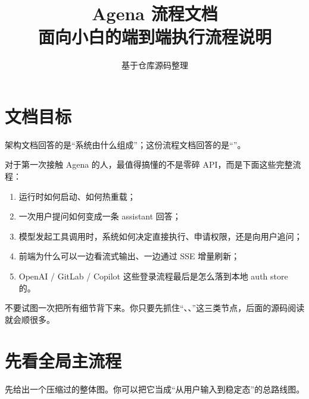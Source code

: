 \documentclass[11pt,a4paper]{ctexart}
\title{\textbf{Agena 流程文档}\\\large 面向小白的端到端执行流程说明}
\author{基于仓库源码整理}
\date{\docversion}
\begin{document}
\maketitle
\tableofcontents
\clearpage

\section{文档目标}

架构文档回答的是“系统由什么组成”；这份流程文档回答的是“”。

对于第一次接触 Agena 的人，最值得搞懂的不是零碎 API，而是下面这些完整流程：

\begin{enumerate}
  \item 运行时如何启动、如何热重载；
  \item 一次用户提问如何变成一条 assistant 回答；
  \item 模型发起工具调用时，系统如何决定直接执行、申请权限，还是向用户追问；
  \item 前端为什么可以一边看流式输出、一边通过 SSE 增量刷新；
  \item OpenAI / GitLab / Copilot 这些登录流程最后是怎么落到本地 auth store 的。
\end{enumerate}

\begin{summarybox}[读流程文档时的建议]
不要试图一次把所有细节背下来。你只要先抓住“、、”这三类节点，后面的源码阅读就会顺很多。
\end{summarybox}

\section{先看全局主流程}

先给出一个压缩过的整体图。你可以把它当成“从用户输入到稳定态”的总路线图。
\end{document}

